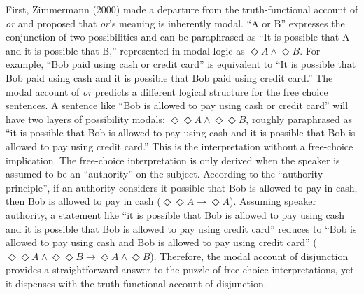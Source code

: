 \documentclass[oneside]{report}
\theoremstyle{definition}
\theoremstyle{definition}
\theoremstyle{definition}
\theoremstyle{remark}
\begin{document}
First, Zimmermann (2000) made a departure from the truth-functional
account of \emph{or} and proposed that \emph{or}'s meaning is inherently
modal. ``A or B'' expresses the conjunction of two possibilities and can
be paraphrased as ``It is possible that A and it is possible that B,''
represented in modal logic as \(\Diamond A \land \Diamond B\). For
example, ``Bob paid using cash or credit card'' is equivalent to ``It is
possible that Bob paid using cash and it is possible that Bob paid using
credit card.'' The modal account of \emph{or} predicts a different
logical structure for the free choice sentences. A sentence like ``Bob
is allowed to pay using cash or credit card'' will have two layers of
possibility modals: \(\Diamond\Diamond A \land \Diamond\Diamond B\),
roughly paraphrased as ``it is possible that Bob is allowed to pay using
cash and it is possible that Bob is allowed to pay using credit card.''
This is the interpretation without a free-choice implication. The
free-choice interpretation is only derived when the speaker is assumed
to be an ``authority'' on the subject. According to the ``authority
principle'', if an authority considers it possible that Bob is allowed
to pay in cash, then Bob is allowed to pay in cash
(\(\Diamond \Diamond A \rightarrow \Diamond A\)). Assuming speaker
authority, a statement like ``it is possible that Bob is allowed to pay
using cash and it is possible that Bob is allowed to pay using credit
card'' reduces to ``Bob is allowed to pay using cash and Bob is allowed
to pay using credit card''
(\(\Diamond\Diamond A \land \Diamond\Diamond B \rightarrow \Diamond A \land \Diamond B\)).
Therefore, the modal account of disjunction provides a straightforward
answer to the puzzle of free-choice interpretations, yet it dispenses
with the truth-functional account of disjunction.
\end{document}
